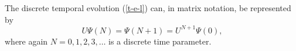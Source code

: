 \documentclass[pra,amsfonts,twocolumn]{revtex4}
\begin{document}
The discrete temporal evolution (\ref{t-e-l}) can, in matrix
notation, be represented by
\begin{equation}
U\Psi (N)= \Psi (N+1)=U^{N+1}\Psi (0),
\label{t-e-l2}
\end{equation}
where again $N=0,1,2,3,\ldots$ is a discrete time parameter.




\end{document}
